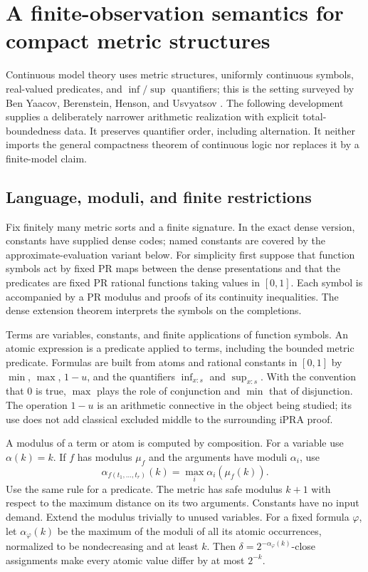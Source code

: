 \section{A finite-observation semantics for compact metric structures}
\label{sec:cm-model}

Continuous model theory uses metric structures, uniformly continuous symbols,
real-valued predicates, and $\inf/\sup$ quantifiers; this is the setting
surveyed by Ben Yaacov, Berenstein, Henson, and Usvyatsov
\cite{bbhu2008}.  The following development supplies a deliberately narrower
arithmetic realization with explicit total-boundedness data.  It preserves
quantifier order, including alternation.  It neither imports the general
compactness theorem of continuous logic nor replaces it by a finite-model
claim.

\subsection{Language, moduli, and finite restrictions}

Fix finitely many metric sorts and a finite signature. In the exact dense
version, constants have supplied dense codes; named constants are covered
by the approximate-evaluation variant below. For simplicity first suppose
that function symbols act by fixed
PR maps between the dense presentations and that the predicates are fixed
PR rational functions taking values in $[0,1]$.  Each symbol is accompanied
by a PR modulus and proofs of its continuity inequalities.  The dense
extension theorem interprets the symbols on the completions.

Terms are variables, constants, and finite applications of function symbols.
An atomic expression is a predicate applied to terms, including the bounded
metric predicate.  Formulas are built from atoms and rational constants in
$[0,1]$ by $\min$, $\max$, $1-u$, and the quantifiers
$\inf_{x:s}$ and $\sup_{x:s}$.  With the convention that $0$ is true,
$\max$ plays the role of conjunction and $\min$ that of disjunction.
The operation $1-u$ is an arithmetic connective in the object being studied;
its use does not add classical excluded middle to the surrounding iPRA
proof.

A modulus of a term or atom is computed by composition.  For a variable use
$\alpha(k)=k$.  If $f$ has modulus $\mu_f$ and the arguments have moduli
$\alpha_i$, use
\[
            \alpha_{f(t_1,\ldots,t_r)}(k)
                    =\max_i\alpha_i(\mu_f(k)).
\tag{M1}\label{eq:cm-atom-modulus}
\]
Use the same rule for a predicate.  The metric has safe modulus $k+1$ with
respect to the maximum distance on its two arguments.  Constants have no
input demand.  Extend the modulus trivially to unused variables.  For a fixed
formula $\varphi$, let $\alpha_\varphi(k)$ be the maximum of the moduli of
all its atomic occurrences, normalized to be nondecreasing and at least $k$.
Then $\delta=2^{-\alpha_\varphi(k)}$-close assignments make every atomic
value differ by at most $2^{-k}$.

